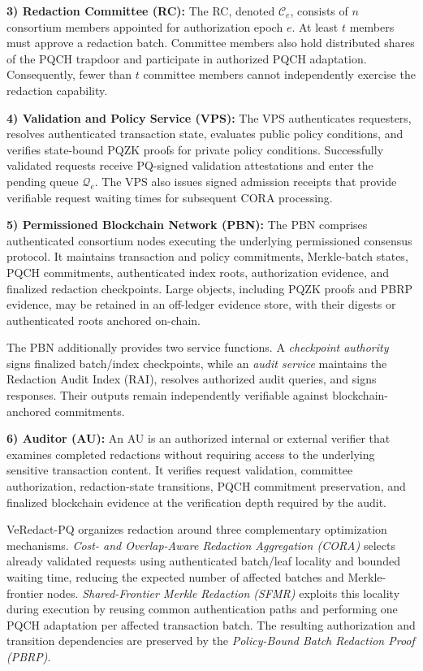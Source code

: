 \documentclass[lettersize,journal]{IEEEtran}
\begin{document}
\textbf{3) Redaction Committee (RC):}
The RC, denoted $\mathcal{C}_e$, consists of $n$ consortium members
appointed for authorization epoch $e$. At least $t$ members must approve
a redaction batch. Committee members also hold distributed shares of
the PQCH trapdoor and participate in authorized PQCH adaptation.
Consequently, fewer than $t$ committee members cannot independently
exercise the redaction capability.

\textbf{4) Validation and Policy Service (VPS):}
The VPS authenticates requesters, resolves authenticated transaction
state, evaluates public policy conditions, and verifies state-bound
PQZK proofs for private policy conditions. Successfully validated
requests receive PQ-signed validation attestations and enter the
pending queue $\mathcal{Q}_e$. The VPS also issues signed admission
receipts that provide verifiable request waiting times for subsequent
CORA processing.

\textbf{5) Permissioned Blockchain Network (PBN):}
The PBN comprises authenticated consortium nodes executing the
underlying permissioned consensus protocol. It maintains transaction
and policy commitments, Merkle-batch states, PQCH commitments,
authenticated index roots, authorization evidence, and finalized
redaction checkpoints. Large objects, including PQZK proofs and PBRP
evidence, may be retained in an off-ledger evidence store, with their
digests or authenticated roots anchored on-chain.

The PBN additionally provides two service functions. A
\emph{checkpoint authority} signs finalized batch/index checkpoints,
while an \emph{audit service} maintains the Redaction Audit Index (RAI),
resolves authorized audit queries, and signs responses. Their outputs
remain independently verifiable against blockchain-anchored
commitments.

\textbf{6) Auditor (AU):}
An AU is an authorized internal or external verifier that examines
completed redactions without requiring access to the underlying
sensitive transaction content. It verifies request validation,
committee authorization, redaction-state transitions, PQCH commitment
preservation, and finalized blockchain evidence at the verification
depth required by the audit.

\medskip
VeRedact-PQ organizes redaction around three complementary optimization
mechanisms. \emph{Cost- and Overlap-Aware Redaction Aggregation (CORA)}
selects already validated requests using authenticated batch/leaf
locality and bounded waiting time, reducing the expected number of
affected batches and Merkle-frontier nodes. \emph{Shared-Frontier
Merkle Redaction (SFMR)} exploits this locality during execution by
reusing common authentication paths and performing one PQCH adaptation
per affected transaction batch. The resulting authorization and
transition dependencies are preserved by the
\emph{Policy-Bound Batch Redaction Proof (PBRP)}.
\end{document}
